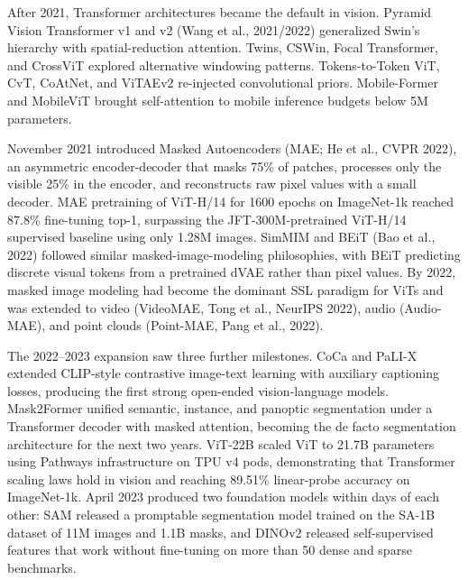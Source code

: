 \documentclass{article}
\begin{document}
After 2021, Transformer architectures became the default in vision. Pyramid Vision Transformer v1 and v2 (Wang et al., 2021/2022) generalized Swin's hierarchy with spatial-reduction attention. Twins, CSWin, Focal Transformer, and CrossViT explored alternative windowing patterns. Tokens-to-Token ViT, CvT, CoAtNet, and ViTAEv2 \citep{zhang2023vitaev2visiontrans} re-injected convolutional priors. Mobile-Former \citep{chen2022mobileformerbridgi} and MobileViT brought self-attention to mobile inference budgets below 5M parameters.

November 2021 introduced Masked Autoencoders (MAE; He et al., CVPR 2022), an asymmetric encoder-decoder that masks 75\% of patches, processes only the visible 25\% in the encoder, and reconstructs raw pixel values with a small decoder. MAE pretraining of ViT-H/14 for 1600 epochs on ImageNet-1k reached 87.8\% fine-tuning top-1, surpassing the JFT-300M-pretrained ViT-H/14 supervised baseline using only 1.28M images. SimMIM \citep{xie2021segformersimpleand} and BEiT (Bao et al., 2022) followed similar masked-image-modeling philosophies, with BEiT predicting discrete visual tokens from a pretrained dVAE rather than pixel values. By 2022, masked image modeling had become the dominant SSL paradigm for ViTs and was extended to video (VideoMAE, Tong et al., NeurIPS 2022), audio (Audio-MAE), and point clouds (Point-MAE, Pang et al., 2022).

The 2022--2023 expansion saw three further milestones. CoCa \citep{yu2022cocacontrastivecap} and PaLI-X \citep{chen2023palixonscalingupam} extended CLIP-style contrastive image-text learning with auxiliary captioning losses, producing the first strong open-ended vision-language models. Mask2Former \citep{cheng2022maskedattentionmas} unified semantic, instance, and panoptic segmentation under a Transformer decoder with masked attention, becoming the de facto segmentation architecture for the next two years. ViT-22B \citep{dehghani2023scalingvisiontrans} scaled ViT to 21.7B parameters using Pathways infrastructure on TPU v4 pods, demonstrating that Transformer scaling laws hold in vision and reaching 89.51\% linear-probe accuracy on ImageNet-1k. April 2023 produced two foundation models within days of each other: SAM \citep{kirillov2023segmentanything} released a promptable segmentation model trained on the SA-1B dataset of 11M images and 1.1B masks, and DINOv2 \citep{oquab2023dinov2learningrobu} released self-supervised features that work without fine-tuning on more than 50 dense and sparse benchmarks.
\end{document}
